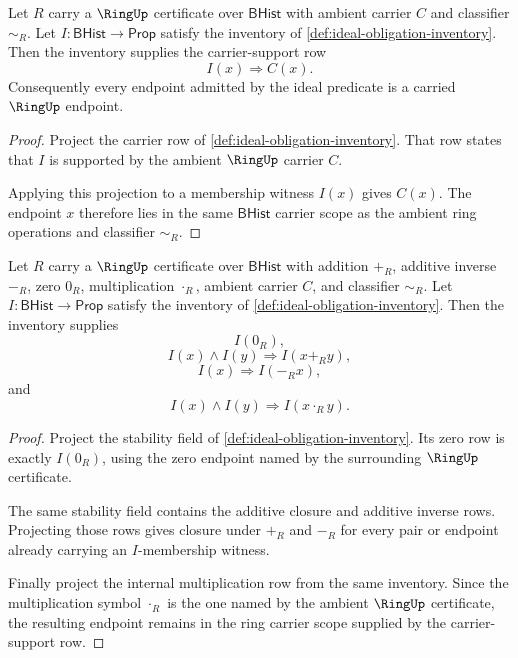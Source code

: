 \begin{theorem}
\label{thm:ideal-carrier-support-row-obligation}
Let $R$ carry a $\RingUp$ certificate over $\mathsf{BHist}$ with ambient carrier
$C$ and classifier $\sim_R$. Let $I:\mathsf{BHist}\to\mathsf{Prop}$ satisfy the
inventory of \autoref{def:ideal-obligation-inventory}. Then the inventory
supplies the carrier-support row
$$
I(x)\Longrightarrow C(x).
$$
Consequently every endpoint admitted by the ideal predicate is a carried
$\RingUp$ endpoint.
\end{theorem}
\begin{proof}
Project the carrier row of \autoref{def:ideal-obligation-inventory}. That row
states that $I$ is supported by the ambient $\RingUp$ carrier $C$.

Applying this projection to a membership witness $I(x)$ gives $C(x)$. The
endpoint $x$ therefore lies in the same $\mathsf{BHist}$ carrier scope as the
ambient ring operations and classifier $\sim_R$.
\end{proof}

\begin{theorem}
\label{thm:ideal-zero-add-neg-obligation}
Let $R$ carry a $\RingUp$ certificate over $\mathsf{BHist}$ with addition
$+_R$, additive inverse $-_R$, zero $0_R$, multiplication $\cdot_R$, ambient
carrier $C$, and classifier $\sim_R$. Let
$I:\mathsf{BHist}\to\mathsf{Prop}$ satisfy the inventory of
\autoref{def:ideal-obligation-inventory}. Then the inventory supplies
$$
I(0_R),
$$
$$
I(x)\land I(y)\Longrightarrow I(x+_R y),
$$
$$
I(x)\Longrightarrow I(-_R x),
$$
and
$$
I(x)\land I(y)\Longrightarrow I(x\cdot_R y).
$$
\end{theorem}
\begin{proof}
Project the stability field of \autoref{def:ideal-obligation-inventory}. Its
zero row is exactly $I(0_R)$, using the zero endpoint named by the surrounding
$\RingUp$ certificate.

The same stability field contains the additive closure and additive inverse
rows. Projecting those rows gives closure under $+_R$ and $-_R$ for every pair
or endpoint already carrying an $I$-membership witness.

Finally project the internal multiplication row from the same inventory. Since
the multiplication symbol $\cdot_R$ is the one named by the ambient $\RingUp$
certificate, the resulting endpoint remains in the ring carrier scope supplied
by the carrier-support row.
\end{proof}

